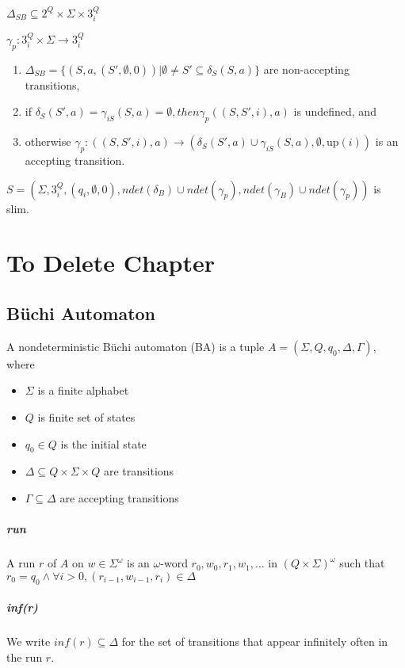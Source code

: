 \documentclass[
	digital
nolof, nolot
]{fithesis3}
\begin{document}
				$\Delta_{SB} \subseteq 2^Q \times \Sigma \times 3^Q_i$
		
				$\gamma_{p}: 3^Q_i \times \Sigma \rightarrow 3^Q_i$
			\begin{enumerate}
				\item $\Delta_{SB}=\{(S, a, (S', \emptyset,0))|\emptyset \neq S' \subseteq \delta_S(S, a)\}$ are non-accepting transitions,
				\item if $\delta_S(S',a)=\gamma_{iS}(S, a)=\emptyset, then \gamma_{p}((S,S',i),a)$ is undefined, and
				\item otherwise $\gamma_p : ((S,S',i),a)\rightarrow (\delta_S(S',a)\cup \gamma_{iS}(S, a), \emptyset, \text{up}(i))$ is an accepting transition.
			\end{enumerate}
		
			$S=(\Sigma, 3^Q_i, (q_i,\emptyset,0), ndet(\delta_B)\cup ndet(\gamma_{p}),ndet(\gamma_B)\cup ndet(\gamma_{p}))$ is slim.
			
		
	\chapter{To Delete Chapter}
		\section{Büchi Automaton}
		A nondeterministic Büchi automaton (BA) is a tuple 
		$A=(\Sigma, Q, q_0, \Delta, \Gamma)$,
		where
		\begin{itemize}
			\item $\Sigma$ is a finite alphabet
			\item $Q$ is finite set of states
			\item $q_0 \in Q$ is the initial state
			\item $\Delta \subseteq Q \times \Sigma \times Q$
			are transitions
			\item $\Gamma \subseteq \Delta$
			are accepting transitions
		\end{itemize} 
		\paragraph{run}
		A run $r$ of $A$ on $w \in \Sigma^\omega$
		is an $\omega$-word $r_0, w_0, r_1, w_1,...$ in $(Q\times\Sigma)^\omega$
		such that $r_0 = q_0 \land\forall i>0, (r_{i-1}, w_{i-1}, r_i) \in \Delta$ 
		\paragraph{inf(r)}
		We write $inf(r) \subseteq \Delta$ for the set of transitions that appear infinitely often in the run $r$.
\end{document}
